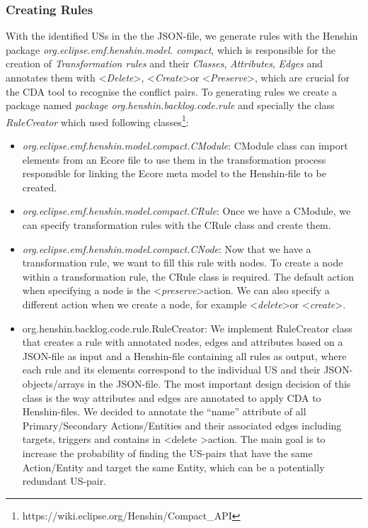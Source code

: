 \subsubsection*{Creating Rules}\label{workflow_rule_creator}
With the identified USs in the the JSON-file, we generate rules with the Henshin package \textit{org.eclipse.emf.henshin.model. compact}, which is responsible for the creation of \textit{Transformation rules} and their \textit{Classes}, \textit{Attributes}, \textit{Edges} and annotates them with \textless\emph{Delete}\textgreater, \textless\textit{Create}\textgreater or \textless\textit{Preserve}\textgreater, which are crucial for the CDA tool to recognise the conflict pairs. 
To generating rules we create a package named \textit{package org.henshin.backlog.code.rule} and specially the class \textit{RuleCreator} which used following classes\footnote{https://wiki.eclipse.org/Henshin/Compact\_API}\label{compact_api}:
\begin{itemize}
\item \textit{org.eclipse.emf.henshin.model.compact.CModule}: CModule class can import elements from an Ecore file to use them in the transformation process responsible for linking the Ecore meta model to the Henshin-file to be created.
\item \textit{org.eclipse.emf.henshin.model.compact.CRule}: Once we have a CModule, we can specify transformation rules with the CRule class and create them.
\item \textit{org.eclipse.emf.henshin.model.compact.CNode}: Now that we have a transformation rule, we want to fill this rule with nodes. To create a node within a transformation rule, the CRule class is required. The default action when specifying a node is the \textless\emph{preserve}\textgreater action. We can also specify a different action when we create a node, for example \textless\emph{delete}\textgreater or \textless\emph{create}\textgreater.
\item org.henshin.backlog.code.rule.RuleCreator: We implement RuleCreator class that creates a rule with annotated nodes, edges and attributes based on a JSON-file as input and a Henshin-file containing all rules as output, where each rule and its elements correspond to the individual US and their JSON-objects/arrays in the JSON-file. The most important design decision of this class is the way attributes and edges are annotated to apply CDA to Henshin-files. We decided to annotate the \enquote{name} attribute of all Primary/Secondary Actions/Entities and their associated edges including targets, triggers and contains in \textless delete \textgreater action. The main goal is to increase the probability of finding the US-pairs that have the same Action/Entity and target the same Entity, which can be a potentially redundant US-pair.
\end{itemize}
